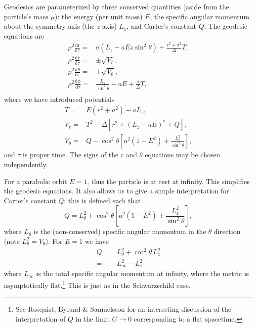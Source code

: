\documentclass[a4paper, 11pt, titlepage, twoside]{report}
\newcommand{\dd}{\ensuremath{\mathrm{d}}}
\newcommand{\diff}[2]{\ensuremath{\frac{\dd {#1}}{\dd {#2}}}}
\begin{document}
Geodesics are parameterized by three conserved quantities (aside from the particle's mass $\mu$): the energy (per unit mass) $E$, the specific angular momentum about the symmetry axis (the $z$-axis) $L_z$, and Carter's constant $Q$\cite{Carter1968, Chandrasekhar1998}. The geodesic equations are
\begin{align}
\rho^2 \diff{t}{\tau} = {} & a\left(L_z - aE z\sin^2 \theta\right) + \frac{r^2 + a^2}{\Delta}T,\\
\rho^2 \diff{r}{\tau} = {} & \pm \sqrt{V_r},\\
\rho^2 \diff{\theta}{\tau} = {} & \pm \sqrt{V_\theta},\\
\rho^2 \diff{\phi}{\tau} = {} & \frac{L_z}{\sin^2 \theta} - aE + \frac{a}{\Delta}T,\\
\end{align}
where we have introduced potentials
\begin{align}
T = {} & E\left(r^2 +a^2\right) - aL_z,\\
V_r = {} & T^2 - \Delta\left[r^2 + \left(L_z -aE\right)^2 + Q\right],\\
V_\theta = {} & Q - \cos^2 \theta\left[a^2\left(1 - E^2\right) + \frac{L_z^2}{\sin^2\theta}\right],
\end{align}
and $\tau$ is proper time. The signs of the $r$ and $\theta$ equations may be chosen independently.

For a parabolic orbit $E = 1$, thus the particle is at rest at infinity. This simplifies the geodesic equations. It also allows us to give a simple interpretation for Carter's constant $Q$: this is defined such that
\begin{equation}
Q = L_\theta^2 + \cos^2\theta\left[a^2\left(1 - E^2\right) + \frac{L_z^2}{\sin^2\theta}\right],
\end{equation}
where $L_\theta$ is the (non-conserved) specific angular momentum in the $\theta$ direction (note $L_\theta^2 = V_\theta$). For $E = 1$ we have
\begin{align}
Q = {} & L_\theta^2 + \cot^2\theta\, L_z^2 \nonumber \\
 = {} & L_\infty^2 - L_z^2
\end{align}
where $L_\infty$ is the total specific angular momentum at infinity, where the metric is asymptotically flat\cite{DeFelice1980}.\footnote{See Rosquist, Bylund \& Samuelsson\cite{Rosquist2009} for an interesting discussion of the interpretation of $Q$ in the limit $G \rightarrow 0$ corresponding to a flat spacetime.} This is just as in the Schwarzschild case.
\end{document}
